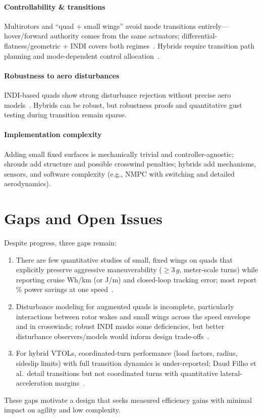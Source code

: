 \paragraph{Controllability \& transitions}
Multirotors and ``quad + small wings'' avoid mode transitions entirely---hover/forward authority comes from the same actuators; differential-flatness/geometric + INDI covers both regimes~\cite{Lee2010,Tal2018}.
Hybrids require transition path planning and mode-dependent control allocation~\cite{DaudFilho2024,Misra2022}.

\paragraph{Robustness to aero disturbances}
INDI-based quads show strong disturbance rejection without precise aero models~\cite{Sieberling2010,Smeur2017,Sun2021}.
Hybrids can be robust, but robustness proofs and quantitative gust testing during transition remain sparse.

\paragraph{Implementation complexity}
Adding small fixed surfaces is mechanically trivial and controller-agnostic; shrouds add structure and possible crosswind penalties; hybrids add mechanisms, sensors, and software complexity (e.g., NMPC with switching and detailed aerodynamics).


\section{Gaps and Open Issues}

Despite progress, three gaps remain:
\begin{enumerate}
  \item There are few quantitative studies of small, fixed wings on quads that explicitly preserve aggressive maneuverability ($\geq 3\,g$, meter-scale turns) while reporting cruise Wh/km (or J/m) and closed-loop tracking error; most report \% power savings at one speed~\cite{Dawkins2018,Xiao2020}.
  \item Disturbance modeling for augmented quads is incomplete, particularly interactions between rotor wakes and small wings across the speed envelope and in crosswinds; robust INDI masks some deficiencies, but better disturbance observers/models would inform design trade-offs~\cite{Sun2021}.
  \item For hybrid VTOLs, coordinated-turn performance (load factors, radius, sideslip limits) with full transition dynamics is under-reported; Daud Filho et al.\ detail transitions but not coordinated turns with quantitative lateral-acceleration margins~\cite{DaudFilho2024}.
\end{enumerate}
These gaps motivate a design that seeks measured efficiency gains with minimal impact on agility and low complexity.


